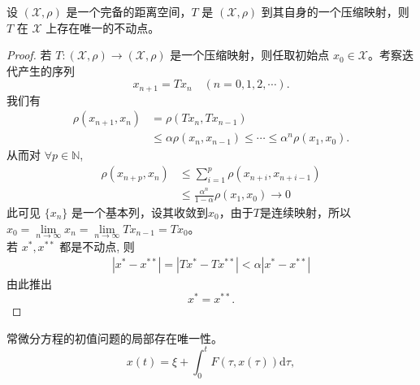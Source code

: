 \documentclass[lang=cn,newtx,10pt,scheme=chinese,thmcnt=chapter]{elegantbook}
\newcommand{\dif}{\mathrm{d}}
\begin{document}
\begin{theorem}
设 $(\mathscr{X}, \rho)$ 是一个完备的距离空间，$T$ 是 $(\mathscr{X}, \rho)$ 到其自身的一个压缩映射，则 $T$ 在 $\mathscr{X}$ 上存在唯一的不动点。
\end{theorem}
\begin{proof}
若 $T:(\mathscr{X}, \rho) \rightarrow (\mathscr{X}, \rho)$ 是一个压缩映射，则任取初始点 $x_0 \in \mathscr{X}$。考察迭代产生的序列
\begin{equation*}
x_{n+1} = T x_n \quad (n = 0, 1, 2, \cdots) .
\end{equation*}
我们有
\begin{equation*}
\begin{aligned}
\rho(x_{n+1}, x_n) &= \rho(T x_n, T x_{n-1}) \\
&\leqslant \alpha \rho(x_n, x_{n-1}) \leqslant \cdots \leqslant \alpha^n \rho(x_1, x_0) .
\end{aligned}
\end{equation*}
从而对 $\forall p \in \mathbb{N}$,
\begin{equation*}
\begin{aligned}
\rho(x_{n+p}, x_n) &\leqslant \sum_{i=1}^p \rho(x_{n+i}, x_{n+i-1}) \\
&\leqslant \frac{\alpha^n}{1 - \alpha} \rho(x_1, x_0) \rightarrow 0
\end{aligned}
\end{equation*}
此可见 $\{x_n\}$ 是一个基本列，设其收敛到$x_0$，由于$T$是连续映射，所以$x_0=\lim\limits_{n\to \infty}x_n=\lim\limits_{n\to \infty}Tx_{n-1}=Tx_0$。\\
若 $x^*, x^{* *}$ 都是不动点, 则
\begin{equation*}
\begin{aligned}
 \left|x^*-x^{* *}\right|  =\left|T x^*-T x^{* *}\right| < \alpha\left|x^*-x^{* *}\right|
\end{aligned}
\end{equation*}
由此推出
\begin{equation*}
x^*=x^{* *} .
\end{equation*}
\end{proof}
\begin{example}
常微分方程的初值问题的局部存在唯一性。
\begin{equation*}
x(t)=\xi+\int_0^t F(\tau, x(\tau)) \dif \tau,
\end{equation*}


\end{example}
\end{document}
